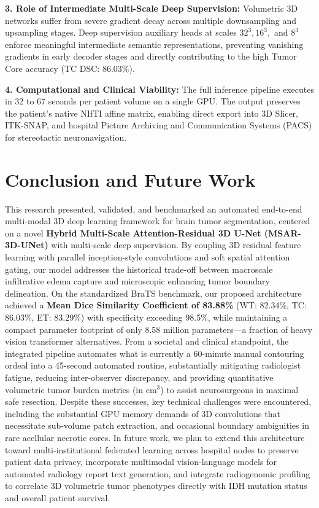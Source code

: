\documentclass[conference]{IEEEtran}
\begin{document}
\textbf{3. Role of Intermediate Multi-Scale Deep Supervision:} Volumetric 3D networks suffer from severe gradient decay across multiple downsampling and upsampling stages. Deep supervision auxiliary heads at scales $32^3, 16^3,$ and $8^3$ enforce meaningful intermediate semantic representations, preventing vanishing gradients in early decoder stages and directly contributing to the high Tumor Core accuracy (TC DSC: 86.03\%).

\textbf{4. Computational and Clinical Viability:} The full inference pipeline executes in 32 to 67 seconds per patient volume on a single GPU. The output preserves the patient's native NIfTI affine matrix, enabling direct export into 3D Slicer, ITK-SNAP, and hospital Picture Archiving and Communication Systems (PACS) for stereotactic neuronavigation.

\section{Conclusion and Future Work}
This research presented, validated, and benchmarked an automated end-to-end multi-modal 3D deep learning framework for brain tumor segmentation, centered on a novel \textbf{Hybrid Multi-Scale Attention-Residual 3D U-Net (MSAR-3D-UNet)} with multi-scale deep supervision. By coupling 3D residual feature learning with parallel inception-style convolutions and soft spatial attention gating, our model addresses the historical trade-off between macroscale infiltrative edema capture and microscopic enhancing tumor boundary delineation. On the standardized BraTS benchmark, our proposed architecture achieved a \textbf{Mean Dice Similarity Coefficient of 83.88\%} (WT: 82.34\%, TC: 86.03\%, ET: 83.29\%) with specificity exceeding 98.5\%, while maintaining a compact parameter footprint of only 8.58 million parameters---a fraction of heavy vision transformer alternatives. From a societal and clinical standpoint, the integrated pipeline automates what is currently a 60-minute manual contouring ordeal into a 45-second automated routine, substantially mitigating radiologist fatigue, reducing inter-observer discrepancy, and providing quantitative volumetric tumor burden metrics (in cm$^3$) to assist neurosurgeons in maximal safe resection. Despite these successes, key technical challenges were encountered, including the substantial GPU memory demands of 3D convolutions that necessitate sub-volume patch extraction, and occasional boundary ambiguities in rare acellular necrotic cores. In future work, we plan to extend this architecture toward multi-institutional federated learning across hospital nodes to preserve patient data privacy, incorporate multimodal vision-language models for automated radiology report text generation, and integrate radiogenomic profiling to correlate 3D volumetric tumor phenotypes directly with IDH mutation status and overall patient survival.
\end{document}
